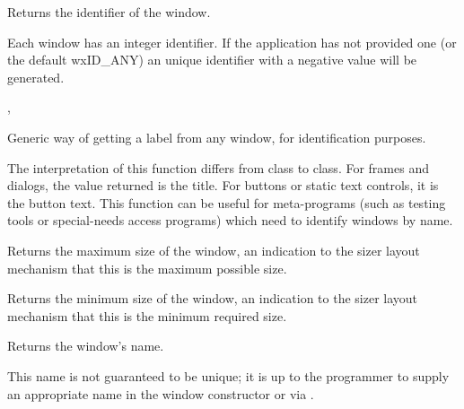 \label{wxwindowgetid}


Returns the identifier of the window.


Each window has an integer identifier. If the application has not provided one
(or the default wxID\_ANY) an unique identifier with a negative value will be generated.


,\rtfsp
{}


\label{wxwindowgetlabel}


Generic way of getting a label from any window, for
identification purposes.


The interpretation of this function differs from class to class.
For frames and dialogs, the value returned is the title. For buttons or static text controls, it is
the button text. This function can be useful for meta-programs (such as testing
tools or special-needs access programs) which need to identify windows
by name.

\label{wxwindowgetmaxsize}


Returns the maximum size of the window, an indication to the sizer layout mechanism
that this is the maximum possible size.

\label{wxwindowgetminsize}


Returns the minimum size of the window, an indication to the sizer layout mechanism
that this is the minimum required size.

\label{wxwindowgetname}


Returns the window's name.


This name is not guaranteed to be unique; it is up to the programmer to supply an appropriate
name in the window constructor or via .

